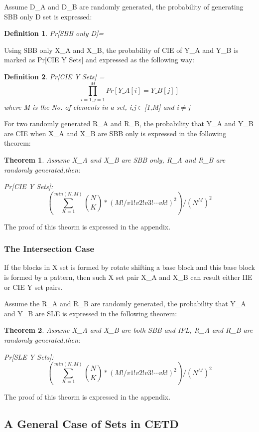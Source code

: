 \documentclass{article}
\newtheorem{theorem}{Theorem}[section]
\newtheorem{defination}{Definition}[section]
\begin{document}
Assume D\_A and D\_B are randomly generated, the probability of generating SBB only D set is expressed:
\begin{defination}
Pr[SBB only D]= 
\end{defination}

Using SBB only X\_A and X\_B, the probability of CIE of Y\_A and Y\_B is marked as Pr[CIE Y Sets] and expressed as the following way:
\begin{defination}
Pr[CIE Y Sets] = $$\prod_{i=1,j=1}^M Pr[Y\_A[i] = Y\_B[j]]$$ where M is the No. of elements in a set, i,j$\in$[1,M] and i$\neq$j
\end{defination} 

For two randomly generated R\_A and R\_B, the probability that Y\_A and Y\_B are CIE when X\_A and X\_B are SBB only is expressed in the following theorem:
\begin{theorem}
Assume X\_A and X\_B are SBB only, R\_A and R\_B are randomly generated,then:

Pr[CIE Y Sets]:
\begin{displaymath}
(\sum_{K=1}^{min(N,M)} \binom{N}{K} * (M!/v1!v2!v3! \cdots vk!) ^ 2 )/(N^M)^2
\end{displaymath}

\end{theorem}
The proof of this theorm is expressed in the appendix.

\subsubsection{The Intersection Case}
If the blocks in X set is formed by rotate shifting a base block and this base block is formed by a pattern, then such X set pair X\_A and X\_B can result either IIE or CIE Y set pairs.

Assume the R\_A and R\_B are randomly generated, the probability that Y\_A and Y\_B are SLE is expressed in the following theorem:
\begin{theorem}
Assume X\_A and X\_B are both SBB and IPL, R\_A and R\_B are randomly generated,then:

Pr[SLE Y Sets]:
\begin{displaymath}
(\sum_{K=1}^{min(N,M)} \binom{N}{K} * (M!/v1!v2!v3! \cdots vk!) ^ 2 )/(N^M)^2
\end{displaymath}
\end{theorem}
The proof of this theorm is expressed in the appendix.

\subsection{A General Case of Sets in CETD}
\end{document}
